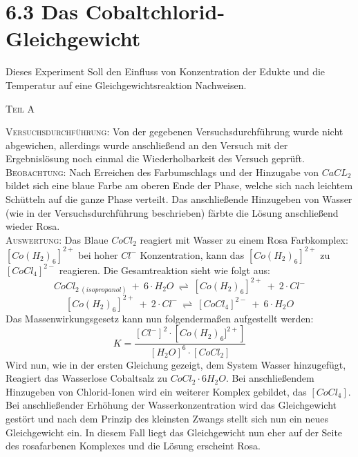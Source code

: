 \documentclass[12pt, a4paper]{article}
\begin{document}
\newpage
\section{6.3 Das Cobaltchlorid-Gleichgewicht}

Dieses Experiment Soll den Einfluss von Konzentration der Edukte und die Temperatur auf eine Gleichgewichtsreaktion Nachweisen.

\begin{center}
\textsc{Teil A}
\end{center}
\textsc{Versuchsdurchführung:} Von der gegebenen Versuchsdurchführung wurde nicht abgewichen, allerdings wurde anschließend an den Versuch mit der Ergebnislösung noch einmal die Wiederholbarkeit des Versuch geprüft.\\

\textsc{Beobachtung:}\hspace{5mm}   Nach Erreichen des Farbumschlags und der Hinzugabe von $CaCL_2$ bildet sich eine blaue Farbe am oberen Ende der Phase, welche sich nach leichtem Schütteln auf die ganze Phase verteilt. Das anschließende Hinzugeben von Wasser (wie in der Versuchsdurchführung beschrieben) färbte die Lösung anschließend wieder Rosa.\\

\textsc{Auswertung:}\hspace{8mm} Das Blaue $CoCl_2$ reagiert mit Wasser zu einem Rosa Farbkomplex: $\left[Co(H_2)_6\right]^{2+}$ bei hoher $Cl^-$ Konzentration, kann das $\left[Co(H_2)_6\right]^{2+}$ zu $[CoCl_4]^{2-}$ reagieren. Die Gesamtreaktion sieht wie folgt aus: $$CoCl_{2\ (isopropanol)}\ +\ 6\cdot H_2O\ \rightleftharpoons\ \left[Co(H_2)_6\right]^{2+}\ +\ 2\cdot Cl^-$$ $$\left[Co(H_2)_6\right]^{2+}\ +\ 2\cdot Cl^-\ \rightleftharpoons\ [CoCl_4]^{2-}\ +\ 6\cdot H_2O$$ Das Massenwirkungsgesetz kann nun folgendermaßen aufgestellt werden: $$K=\frac{\left[Cl^-\right]^2\cdot \left[Co(H_2)_6]^{2+}\right]}{[H_2O]^6\cdot [CoCl_2]}$$ Wird nun, wie in der ersten Gleichung gezeigt, dem System Wasser hinzugefügt, Reagiert das Wasserlose Cobaltsalz zu $CoCl_2\cdot 6H_2O$. Bei anschließendem Hinzugeben von Chlorid-Ionen wird ein weiterer Komplex gebildet, das $[CoCl_4]$. Bei anschließender Erhöhung der Wasserkonzentration wird das Gleichgewicht gestört und nach dem Prinzip des kleinsten Zwangs stellt sich nun ein neues Gleichgewicht ein. In diesem Fall liegt das Gleichgewicht nun eher auf der Seite des rosafarbenen Komplexes und die Lösung erscheint Rosa.\\
\end{document}
